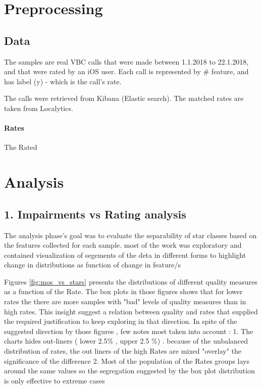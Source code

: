 
\section{Preprocessing}

\subsection{Data}

The samples are real VBC calls that were made between 1.1.2018 to 22.1.2018, and that were rated by an iOS user. Each call is represented by # feature, and has label (y) - which is the call's rate.

The calls were retrieved from Kibana (Elastic search). The matched rates are taken from Localytics.

\paragraph{Rates}\label{Rates}

The Rated


\section{Analysis}

\subsection{1. Impairments vs Rating analysis}

The analysis phase's goal was to evaluate the separability of star classes based on the features collected for each sample.
most of the work was exploratory and contained visualization of segements of the deta in different forms to highlight change in distributions as function of change in feature/s

Figures  \ref{fig:mos_vs_stars} presents the distributions of different quality measures as a function of the Rate. The box plots in those figures shows that for lower rates the there are more samples with "bad" levels of quality measures than in high rates.
This insight suggest a relation between quality and rates that supplied the required justification to keep exploring in that direction.
In spite of the suggested direction by those figures , few notes most taken into account :
1. The charts hides out-liners ( lower 2.5\% , upper 2.5 \%) . because of the unbalanced distribution of rates, the out liners of the high Rates are mixed "overlay" the significance of the difference 
2. Most of the population of the Rates groups lays around the same values so the segregation suggested by the box plot distribution is only effective to extreme cases 

